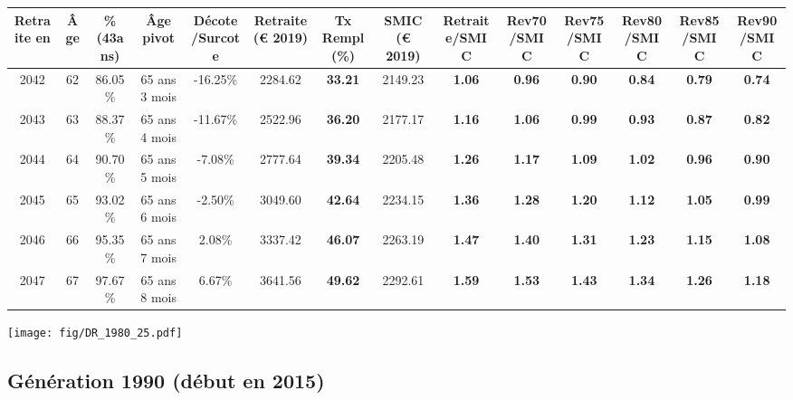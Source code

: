 \begin{adjustbox}{max width=\textwidth} 
\begin{tabular}[htb]{|c|c||c|c|c||c|c||c||c|c|c|c|c|c|} 
\hline 
 Retraite en &  Âge &  \%(43ans) &  Âge pivot &  Décote/Surcote &  Retraite (\euro{} 2019) &  Tx Rempl(\%) &  SMIC (\euro{} 2019) &  Retraite/SMIC &  Rev70/SMIC &  Rev75/SMIC &  Rev80/SMIC &  Rev85/SMIC &  Rev90/SMIC \\ 
\hline \hline 
 2042 &  62 &  86.05\% &  65 ans 3 mois &  -16.25\% &  2284.62 &  {\bf 33.21} &  2149.23 &  {\bf 1.06} &  {\bf {\color{red} 0.96}} &  {\bf {\color{red} 0.90}} &  {\bf {\color{red} 0.84}} &  {\bf {\color{red} 0.79}} &  {\bf {\color{red} 0.74}} \\ 
\hline 
 2043 &  63 &  88.37\% &  65 ans 4 mois &  -11.67\% &  2522.96 &  {\bf 36.20} &  2177.17 &  {\bf 1.16} &  {\bf 1.06} &  {\bf {\color{red} 0.99}} &  {\bf {\color{red} 0.93}} &  {\bf {\color{red} 0.87}} &  {\bf {\color{red} 0.82}} \\ 
\hline 
 2044 &  64 &  90.70\% &  65 ans 5 mois &  -7.08\% &  2777.64 &  {\bf 39.34} &  2205.48 &  {\bf 1.26} &  {\bf 1.17} &  {\bf 1.09} &  {\bf 1.02} &  {\bf {\color{red} 0.96}} &  {\bf {\color{red} 0.90}} \\ 
\hline 
 2045 &  65 &  93.02\% &  65 ans 6 mois &  -2.50\% &  3049.60 &  {\bf 42.64} &  2234.15 &  {\bf 1.36} &  {\bf 1.28} &  {\bf 1.20} &  {\bf 1.12} &  {\bf 1.05} &  {\bf {\color{red} 0.99}} \\ 
\hline 
 2046 &  66 &  95.35\% &  65 ans 7 mois &  2.08\% &  3337.42 &  {\bf 46.07} &  2263.19 &  {\bf 1.47} &  {\bf 1.40} &  {\bf 1.31} &  {\bf 1.23} &  {\bf 1.15} &  {\bf 1.08} \\ 
\hline 
 2047 &  67 &  97.67\% &  65 ans 8 mois &  6.67\% &  3641.56 &  {\bf 49.62} &  2292.61 &  {\bf 1.59} &  {\bf 1.53} &  {\bf 1.43} &  {\bf 1.34} &  {\bf 1.26} &  {\bf 1.18} \\ 
\hline 
\hline 
\end{tabular} 
\end{adjustbox} 
 
 \vspace{0.1cm} 

 \begin{center}\texttt{[image: fig/DR\_1980\_25.pdf]}\end{center} \label{fig/DR_1980_25.pdf} 

\newpage 
 
\subsection{Génération 1990 (début en 2015)} 

